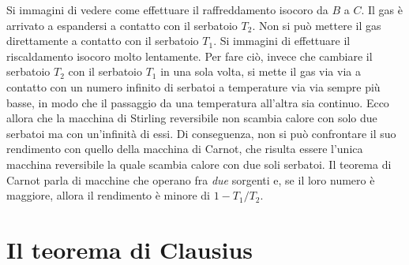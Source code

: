 \documentclass[10pt,a4paper]{book}
\begin{document}
\begin{figure}[htpb]
\end{figure}
\FloatBarrier
Si immagini di vedere come effettuare il raffreddamento isocoro da $B$ a $C$. Il gas è arrivato a espandersi a contatto con il serbatoio $T_2$. Non si può mettere il gas direttamente a contatto con il serbatoio $T_1$. Si immagini di effettuare il riscaldamento isocoro molto lentamente. Per fare ciò, invece che cambiare il serbatoio $T_2$ con il serbatoio $T_1$ in una sola volta, si mette il gas via via a contatto con un numero infinito di serbatoi a temperature via via sempre più basse, in modo che il passaggio da una temperatura all'altra sia continuo. Ecco allora che la macchina di Stirling reversibile non scambia calore con solo due serbatoi ma con un'infinità di essi. Di conseguenza, non si può confrontare il suo rendimento con quello della macchina di Carnot, che risulta essere l'unica macchina reversibile la quale scambia calore con due soli serbatoi. Il teorema di Carnot parla di macchine che operano fra \emph{due} sorgenti e, se il loro numero è maggiore, allora il rendimento è minore di $1-T_1/T_2$.







































\section{Il teorema di Clausius}
\end{document}

